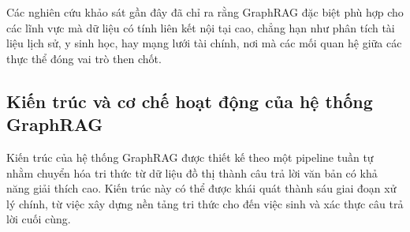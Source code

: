 Các nghiên cứu khảo sát gần đây \cite{peng2024graph, han2024retrieval} đã chỉ ra rằng GraphRAG đặc biệt phù hợp cho các lĩnh vực mà dữ liệu có tính liên kết nội tại cao, chẳng hạn như phân tích tài liệu lịch sử, y sinh học, hay mạng lưới tài chính, nơi mà các mối quan hệ giữa các thực thể đóng vai trò then chốt.

\subsection{Kiến trúc và cơ chế hoạt động của hệ thống GraphRAG}

Kiến trúc của hệ thống GraphRAG được thiết kế theo một pipeline tuần tự nhằm chuyển hóa tri thức từ dữ liệu đồ thị thành câu trả lời văn bản có khả năng giải thích cao. Kiến trúc này có thể được khái quát thành sáu giai đoạn xử lý chính, từ việc xây dựng nền tảng tri thức cho đến việc sinh và xác thực câu trả lời cuối cùng.

